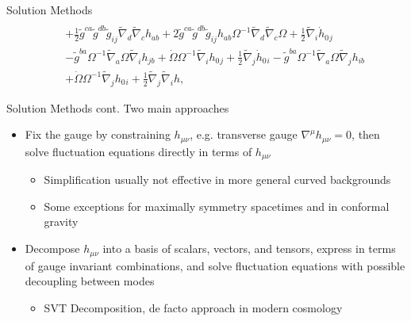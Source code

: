 \documentclass[8pt]{beamer}
\begin{document}
\begin{frame}{Solution Methods}
\begin{eqnarray*}
		\nonumber\\
		&& + \tfrac{1}{2} \tilde{g}^{ca} \tilde{g}^{db} \tilde{g}_{ij} \tilde{\nabla}_{d}\tilde{\nabla}_{c}h_{ab}  + 2 \tilde{g}^{ca} \tilde{g}^{db} \tilde{g}_{ij} h_{ab} \Omega^{-1} \tilde{\nabla}_{d}\tilde{\nabla}_{c}\Omega + \tfrac{1}{2} \tilde{\nabla}_{i}\dot{h}_{0}{}_{j} 
		\nonumber\\
		&& -  \tilde{g}^{ba} \Omega^{-1} \tilde{\nabla}_{a}\Omega \tilde{\nabla}_{i}h_{jb} + \dot{\Omega} \Omega^{-1} \tilde{\nabla}_{i}h_{0}{}_{j} + \tfrac{1}{2} \tilde{\nabla}_{j}\dot{h}_{0}{}_{i} -  \tilde{g}^{ba} \Omega^{-1} \tilde{\nabla}_{a}\Omega \tilde{\nabla}_{j}h_{ib}
		\nonumber\\
		&&  + \dot{\Omega} \Omega^{-1} \tilde{\nabla}_{j}h_{0}{}_{i} + \tfrac{1}{2} \tilde{\nabla}_{j}\tilde{\nabla}_{i}h,
	\end{eqnarray*}

\end{frame}


\begin{frame}{Solution Methods cont.}
	Two main approaches
	\begin{itemize}
		\item Fix the gauge by constraining $h_{\mu\nu}$, e.g. transverse gauge $\nabla^\mu h_{\mu\nu} = 0$, then solve fluctuation equations directly in terms of $h_{\mu\nu}$
		\begin{itemize}
			\item Simplification usually not effective in more general curved backgrounds
			\item Some exceptions for maximally symmetry spacetimes and in conformal gravity
		\end{itemize}
		\item Decompose $h_{\mu\nu}$ into a basis of scalars, vectors, and tensors, express in terms of gauge invariant combinations, and solve fluctuation equations with possible decoupling between modes 
		\begin{itemize}
			\item SVT Decomposition, de facto approach in modern cosmology
		\end{itemize}
	\end{itemize}
\end{frame}

\end{document}
